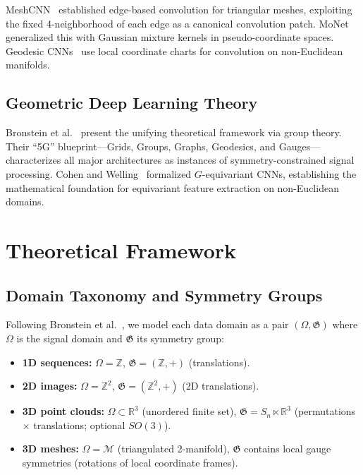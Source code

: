 \documentclass[10pt,conference]{IEEEtran}
\newcommand{\R}{\mathbb{R}}
\newcommand{\Z}{\mathbb{Z}}
\newcommand{\fG}{\mathfrak{G}}
\begin{document}
MeshCNN~\cite{hanocka2019meshcnn} established edge-based convolution for
triangular meshes, exploiting the fixed 4-neighborhood of each edge as a
canonical convolution patch. MoNet~\cite{monti2017geometric} generalized
this with Gaussian mixture kernels in pseudo-coordinate spaces. Geodesic
CNNs~\cite{masci2015geodesic} use local coordinate charts for convolution
on non-Euclidean manifolds.

\subsection{Geometric Deep Learning Theory}

Bronstein et al.~\cite{bronstein2021geometric} present the unifying
theoretical framework via group theory. Their ``5G'' blueprint---Grids,
Groups, Graphs, Geodesics, and Gauges---characterizes all major
architectures as instances of symmetry-constrained signal processing.
Cohen and Welling~\cite{cohen2016group} formalized $G$-equivariant CNNs,
establishing the mathematical foundation for equivariant feature
extraction on non-Euclidean domains.

\section{Theoretical Framework}
\label{sec:theory}

\subsection{Domain Taxonomy and Symmetry Groups}

Following Bronstein et al.~\cite{bronstein2021geometric}, we model each
data domain as a pair $(\Omega, \fG)$ where $\Omega$ is the signal domain
and $\fG$ its symmetry group:

\begin{itemize}
  \item \textbf{1D sequences:} $\Omega{=}\Z$,
    $\fG{=}(\Z,{+})$ (translations).
  \item \textbf{2D images:} $\Omega{=}\Z^2$,
    $\fG{=}(\Z^2,{+})$ (2D translations).
  \item \textbf{3D point clouds:} $\Omega{\subset}\R^3$ (unordered finite
    set), $\fG{=}S_n{\ltimes}\R^3$ (permutations $\times$ translations;
    optional $SO(3)$).
  \item \textbf{3D meshes:} $\Omega{=}\mathcal{M}$ (triangulated
    2-manifold), $\fG$ contains local gauge symmetries (rotations of local
    coordinate frames).
\end{itemize}
\end{document}
